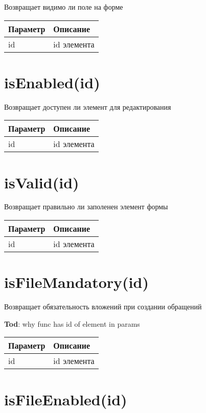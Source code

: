 Возвращает видимо ли поле на форме


\begin{longtable}[]{@{}ll@{}}
\toprule
Параметр & Описание\tabularnewline
\midrule
\endhead
id & id элемента\tabularnewline
\bottomrule
\end{longtable}

\hypertarget{isenabledid-boolean}{%
\section{isEnabled(id)}\label{isenabledid-boolean}}

Возвращает доступен ли элемент для редактирования


\begin{longtable}[]{@{}ll@{}}
\toprule
Параметр & Описание\tabularnewline
\midrule
\endhead
id & id элемента\tabularnewline
\bottomrule
\end{longtable}

\hypertarget{isvalidid-boolean}{%
\section{isValid(id)}\label{isvalidid-boolean}}

Возвращает правильно ли заполенен элемент формы


\begin{longtable}[]{@{}ll@{}}
\toprule
Параметр & Описание\tabularnewline
\midrule
\endhead
id & id элемента\tabularnewline
\bottomrule
\end{longtable}

\hypertarget{isfilemandatoryid-boolean}{%
\section{isFileMandatory(id)}\label{isfilemandatoryid-boolean}}

Возвращает обязательность вложений при создании обращений

\textbf{Tod}: why func has id of element in params

\begin{longtable}[]{@{}ll@{}}
\toprule
Параметр & Описание\tabularnewline
\midrule
\endhead
id & id элемента\tabularnewline
\bottomrule
\end{longtable}

\hypertarget{isfileenabledid-boolean}{%
\section{isFileEnabled(id)}\label{isfileenabledid-boolean}}

